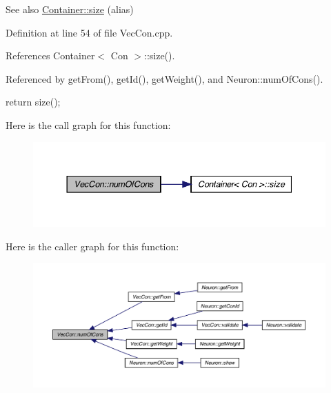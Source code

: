 \begin{DoxySeeAlso}{See also}
\hyperlink{class_container_a842c3d9eca81b78b59112fde9707b091}{Container::size} (alias) 
\end{DoxySeeAlso}


Definition at line 54 of file VecCon.cpp.



References Container$<$ Con $>$::size().



Referenced by getFrom(), getId(), getWeight(), and Neuron::numOfCons().


\begin{DoxyCode}
{
  return size();
}
\end{DoxyCode}


Here is the call graph for this function:\nopagebreak
\begin{figure}[H]
\begin{center}
\leavevmode
\includegraphics[width=344pt]{class_vec_con_aa9a397520b07fbeead0b6d252c1ea882_cgraph}
\end{center}
\end{figure}




Here is the caller graph for this function:
\nopagebreak
\begin{figure}[H]
\begin{center}
\leavevmode
\includegraphics[width=400pt]{class_vec_con_aa9a397520b07fbeead0b6d252c1ea882_icgraph}
\end{center}
\end{figure}


